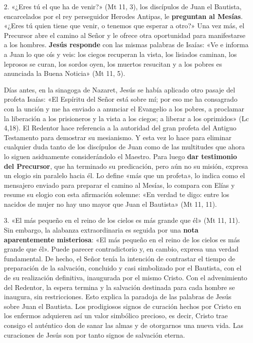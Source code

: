\documentclass[]{article}
\begin{document}
2. «¿Eres tú el que ha de venir?» (Mt 11, 3), los discípulos de Juan el
Bautista, encarcelados por el rey perseguidor Herodes Antipas, le
\textbf{preguntan al Mesías}. «¿Eres tú quien tiene que venir, o tenemos
que esperar a otro?» Una vez más, el Precursor abre el camino al Señor y
le ofrece otra oportunidad para manifestarse a los hombres.
\textbf{Jesús responde} con las mismas palabras de Isaías: «Ve e informa
a Juan lo que oís y veis: los ciegos recuperan la vista, los lisiados
caminan, los leprosos se curan, los sordos oyen, los muertos resucitan y
a los pobres es anunciada la Buena Noticia» (Mt 11, 5).

Días antes, en la sinagoga de Nazaret, Jesús se había aplicado otro
pasaje del profeta Isaías: «El Espíritu del Señor está sobre mí; por eso
me ha consagrado con la unción y me ha enviado a anunciar el Evangelio a
los pobres, a proclamar la liberación a los prisioneros y la vista a los
ciegos; a liberar a los oprimidos» (Lc 4,18). El Redentor hace
referencia a la autoridad del gran profeta del Antiguo Testamento para
demostrar su mesianismo. Y esta vez lo hace para eliminar cualquier duda
tanto de los discípulos de Juan como de las multitudes que ahora lo
siguen asiduamente considerándolo el Maestro. Para luego \textbf{dar
testimonio del Precursor}, que ha terminado su predicación, pero aún no
su misión, expresa un elogio sin paralelo hacia él. Lo define «más que
un profeta», lo indica como el mensajero enviado para preparar el camino
al Mesías, lo compara con Elías y resume su elogio con esta afirmación
solemne: «En verdad te digo: entre los nacidos de mujer no hay uno mayor
que Juan el Bautista» (Mt 11, 11).

3. «El más pequeño en el reino de los cielos es más grande que él» (Mt
11, 11). Sin embargo, la alabanza extraordinaria es seguida por una
\textbf{nota aparentemente misteriosa}: «El más pequeño en el reino de
los cielos es más grande que él». Puede parecer contradictorio y, en
cambio, expresa una verdad fundamental. De hecho, el Señor tenía la
intención de contrastar el tiempo de preparación de la salvación,
concluido y casi simbolizado por el Bautista, con el de su realización
definitiva, inaugurada por el mismo Cristo. Con el advenimiento del
Redentor, la espera termina y la salvación destinada para cada hombre se
inaugura, sin restricciones. Esto explica la paradoja de las palabras de
Jesús sobre Juan el Bautista. Los prodigiosos signos de curación hechos
por Cristo en los enfermos adquieren así un valor simbólico precioso, es
decir, Cristo trae consigo el auténtico don de sanar las almas y de
otorgarnos una nueva vida. Las curaciones de Jesús son por tanto signos
de salvación eterna.
\end{document}
